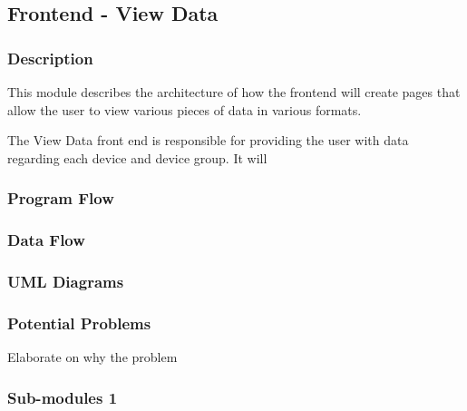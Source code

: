 
\subsection{Frontend - View Data}

\subsubsection{Description}

This module describes the architecture of how the frontend will create pages that allow the user to view various pieces of data in various formats.

The View Data front end is responsible for providing the user with data regarding each device and device group. 
It will 

\subsubsection{Program Flow}




\subsubsection{Data Flow}


\subsubsection{UML Diagrams}


\subsubsection{Potential Problems}

Elaborate on why the problem

\subsubsection{Sub-modules 1}

